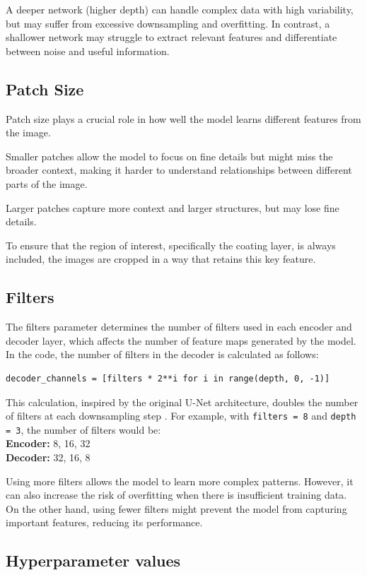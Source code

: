 A deeper network (higher depth) can handle complex data with high variability, but may suffer from excessive downsampling and overfitting. In contrast, a shallower network may struggle to extract relevant features and differentiate between noise and useful information.

\subsection{Patch Size}
Patch size plays a crucial role in how well the model learns different features from the image.

Smaller patches allow the model to focus on fine details but might miss the broader context, making it harder to understand relationships between different parts of the image.

Larger patches capture more context and larger structures, but may lose fine details.

To ensure that the region of interest, specifically the coating layer, is always included, the images are cropped in a way that retains this key feature.

\subsection{Filters}
The filters parameter determines the number of filters used in each encoder and decoder layer, which affects the number of feature maps generated by the model. In the code, the number of filters in the decoder is calculated as follows:

\begin{verbatim}
decoder_channels = [filters * 2**i for i in range(depth, 0, -1)]
\end{verbatim}

This calculation, inspired by the original U-Net architecture, doubles the number of filters at each downsampling step \cite{2018arXiv180906839B}. For example, with \texttt{filters = 8} and \texttt{depth = 3}, the number of filters would be:  
\\\textbf{Encoder:} 8, 16, 32 \\
\textbf{Decoder:} 32, 16, 8

Using more filters allows the model to learn more complex patterns. However, it can also increase the risk of overfitting when there is insufficient training data. On the other hand, using fewer filters might prevent the model from capturing important features, reducing its performance.
\newpage
\subsection{Hyperparameter values}\label{sec:1.2.8}


